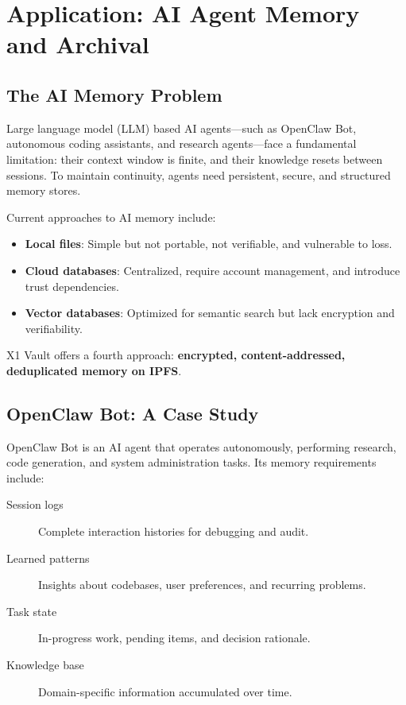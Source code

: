 \documentclass[11pt,a4paper]{article}
\begin{document}
\section{Application: AI Agent Memory and Archival}

\subsection{The AI Memory Problem}

Large language model (LLM) based AI agents---such as OpenClaw Bot, autonomous coding assistants, and research agents---face a fundamental limitation: their context window is finite, and their knowledge resets between sessions. To maintain continuity, agents need persistent, secure, and structured memory stores.

Current approaches to AI memory include:

\begin{itemize}
    \item \textbf{Local files}: Simple but not portable, not verifiable, and vulnerable to loss.
    \item \textbf{Cloud databases}: Centralized, require account management, and introduce trust dependencies.
    \item \textbf{Vector databases}: Optimized for semantic search but lack encryption and verifiability.
\end{itemize}

X1 Vault offers a fourth approach: \textbf{encrypted, content-addressed, deduplicated memory on IPFS}.

\subsection{OpenClaw Bot: A Case Study}

OpenClaw Bot is an AI agent that operates autonomously, performing research, code generation, and system administration tasks. Its memory requirements include:

\begin{description}
    \item[Session logs] Complete interaction histories for debugging and audit.
    \item[Learned patterns] Insights about codebases, user preferences, and recurring problems.
    \item[Task state] In-progress work, pending items, and decision rationale.
    \item[Knowledge base] Domain-specific information accumulated over time.
\end{description}
\end{document}
